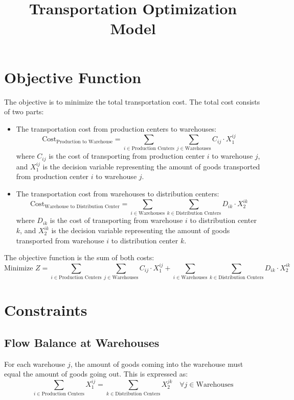 \documentclass[12pt]{article}
\begin{document}
\title{Transportation Optimization Model}
\author{}
\date{}
\maketitle

\section*{Objective Function}

The objective is to minimize the total transportation cost. The total cost consists of two parts:

\begin{itemize}
    \item The transportation cost from production centers to warehouses:
    \[
    \text{Cost}_{\text{Production to Warehouse}} = \sum_{i \in \text{Production Centers}} \sum_{j \in \text{Warehouses}} C_{ij} \cdot X_1^{ij}
    \]
    where \( C_{ij} \) is the cost of transporting from production center \( i \) to warehouse \( j \), and \( X_1^{ij} \) is the decision variable representing the amount of goods transported from production center \( i \) to warehouse \( j \).

    \item The transportation cost from warehouses to distribution centers:
    \[
    \text{Cost}_{\text{Warehouse to Distribution Center}} = \sum_{i \in \text{Warehouses}} \sum_{k \in \text{Distribution Centers}} D_{ik} \cdot X_2^{ik}
    \]
    where \( D_{ik} \) is the cost of transporting from warehouse \( i \) to distribution center \( k \), and \( X_2^{ik} \) is the decision variable representing the amount of goods transported from warehouse \( i \) to distribution center \( k \).
\end{itemize}

The objective function is the sum of both costs:
\[
\text{Minimize } Z = \sum_{i \in \text{Production Centers}} \sum_{j \in \text{Warehouses}} C_{ij} \cdot X_1^{ij} + \sum_{i \in \text{Warehouses}} \sum_{k \in \text{Distribution Centers}} D_{ik} \cdot X_2^{ik}
\]

\section*{Constraints}

\subsection*{Flow Balance at Warehouses}
For each warehouse \( j \), the amount of goods coming into the warehouse must equal the amount of goods going out. This is expressed as:
\[
\sum_{i \in \text{Production Centers}} X_1^{ij} = \sum_{k \in \text{Distribution Centers}} X_2^{jk} \quad \forall j \in \text{Warehouses}
\]
\end{document}
